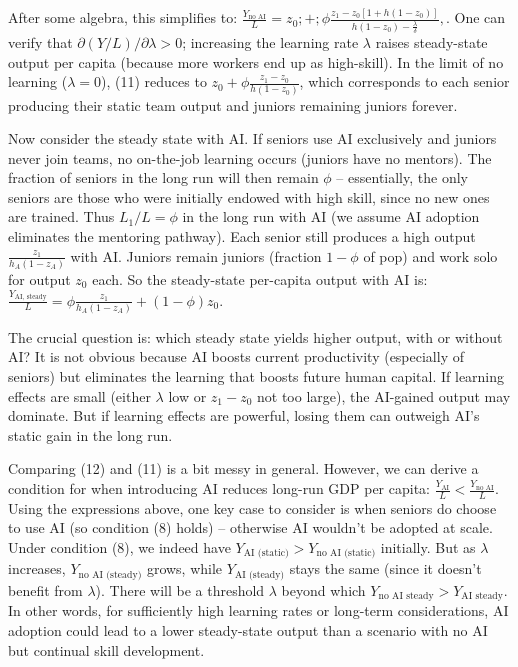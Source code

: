 \documentclass[12pt]{article}
\begin{document}
After some algebra, this simplifies to: $ \frac{Y_{\text{no AI}}}{L} =
z_0 ;+;
\phi \frac{z_1 - z_0[1 + h (1-z_0)]}{h(1-z_0) - \frac{\lambda}{\delta}},.
\tag{11}$ One can verify that \(\partial (Y/L)/\partial \lambda > 0\);
increasing the learning rate \(\lambda\) raises steady-state output per
capita (because more workers end up as high-skill). In the limit of no
learning (\(\lambda=0\)), (11) reduces to
\(z_0 + \phi\frac{z_1 - z_0}{h(1-z_0)}\), which corresponds to each
senior producing their static team output and juniors remaining juniors
forever.

Now consider the steady state {with AI}. If seniors use AI
exclusively and juniors never join teams, {no on-the-job learning
occurs} (juniors have no mentors). The fraction of seniors in the long
run will then remain \(\phi\) -- essentially, the only seniors are those
who were initially endowed with high skill, since no new ones are
trained. Thus \(L_1/L = \phi\) in the long run with AI (we assume AI
adoption eliminates the mentoring pathway). Each senior still produces a
high output \(\frac{z_1}{h_A(1-z_A)}\) with AI. Juniors remain juniors
(fraction \(1-\phi\) of pop) and work solo for output \(z_0\) each. So
the {steady-state per-capita output with AI} is: $
\frac{Y_{\text{AI, steady}}}{L} = \phi \frac{z_1}{h_A(1-z_A)} +
(1-\phi) z_0. \tag{12}$

The crucial question is: {which steady state yields higher output,
with or without AI?} It is not obvious because {AI boosts current
productivity} (especially of seniors) but {eliminates the
learning that boosts future human capital}. If learning effects are
small (either \(\lambda\) low or \(z_1 - z_0\) not too large), the
AI-gained output may dominate. But if learning effects are powerful,
losing them can outweigh AI's static gain in the long run.

Comparing (12) and (11) is a bit messy in general. However, we can
derive a condition for when introducing AI {reduces long-run GDP
per capita}: \(\frac{Y_{\text{AI}}}{L} < \frac{Y_{\text{no AI}}}{L}.\)
Using the expressions above, one key case to consider is when seniors
{do} choose to use AI (so condition (8) holds) -- otherwise AI
wouldn't be adopted at scale. Under condition (8), we indeed have
\(Y_{\text{AI (static)}} > Y_{\text{no AI (static)}}\) initially. But as
\(\lambda\) increases, \(Y_{\text{no AI (steady)}}\) grows, while
\(Y_{\text{AI (steady)}}\) stays the same (since it doesn't benefit from
\(\lambda\)). There will be a threshold \(\lambda\) beyond which
\(Y_{\text{no AI steady}} > Y_{\text{AI steady}}\). In other words,
{for sufficiently high learning rates or long-term
considerations, AI adoption could lead to a lower steady-state output}
than a scenario with no AI but continual skill development.
\end{document}
